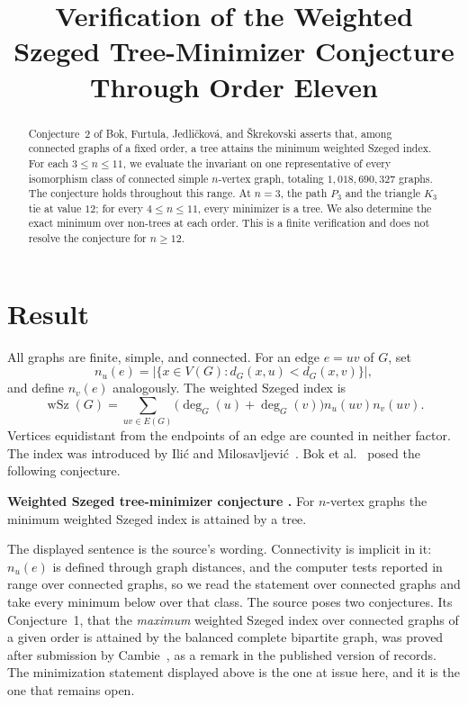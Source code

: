 \documentclass[11pt]{amsart}
\title[The weighted Szeged tree-minimizer conjecture]{
  Verification of the Weighted Szeged Tree-Minimizer Conjecture
  Through Order Eleven
}
\date{}
\newcommand{\wSz}{\operatorname{wSz}}
\begin{document}
\begin{abstract}
Conjecture~2 of Bok, Furtula, Jedli\v{c}kov\'a, and
\v{S}krekovski asserts that, among connected graphs of a fixed order,
a tree attains the minimum weighted Szeged index. For each
$3\le n\le 11$, we evaluate the invariant on one representative of
every isomorphism class of connected simple $n$-vertex graph, totaling
$1{,}018{,}690{,}327$ graphs. The conjecture holds throughout this
range. At $n=3$, the path $P_3$ and the triangle $K_3$ tie at value
$12$; for every $4\le n\le 11$, every minimizer is a tree. We also
determine the exact minimum over non-trees at each order. This is a
finite verification and does not resolve the conjecture for
$n\ge 12$.
\end{abstract}

\maketitle

\section{Result}

All graphs are finite, simple, and connected. For an edge $e=uv$ of
$G$, set
\[
  n_u(e)
  =
  \bigl|
    \{x\in V(G):d_G(x,u)<d_G(x,v)\}
  \bigr|,
\]
and define $n_v(e)$ analogously. The weighted Szeged index is
\[
  \wSz(G)
  =
  \sum_{uv\in E(G)}
  \bigl(\deg_G(u)+\deg_G(v)\bigr)n_u(uv)n_v(uv).
\]
Vertices equidistant from the endpoints of an edge are counted in
neither factor. The index was introduced by Ili\'c and
Milosavljevi\'c~\cite{IlicMilosavljevic2013}. Bok et
al.~\cite{BokEtAl2019} posed the following conjecture.

\medskip

\noindent
\textbf{Weighted Szeged tree-minimizer conjecture
\cite[Conjecture~2]{BokEtAl2019}.}
For $n$-vertex graphs the minimum weighted Szeged index is attained by
a tree.

\medskip

The displayed sentence is the source's wording. Connectivity is
implicit in it: $n_u(e)$ is defined through graph distances, and the
computer tests reported in \cite{BokEtAl2019} range over connected
graphs, so we read the statement over connected graphs and take every
minimum below over that class. The source poses two conjectures. Its
Conjecture~1, that the \emph{maximum} weighted Szeged index over
connected graphs of a given order is attained by the balanced complete
bipartite graph, was proved after submission by
Cambie~\cite{Cambie2021}, as a remark in the published version of
\cite{BokEtAl2019} records. The minimization statement displayed above
is the one at issue here, and it is the one that remains open.
\end{document}
